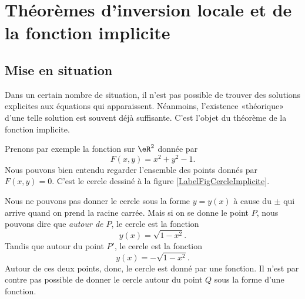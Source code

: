 

                    \section{Théorèmes d'inversion locale et de la fonction implicite}

\subsection{Mise en situation}

Dans un certain nombre de situation, il n'est pas possible de trouver des solutions explicites aux équations qui apparaissent. Néanmoins, l'existence «théorique» d'une telle solution est souvent déjà suffisante. C'est l'objet du théorème de la fonction implicite.

Prenons par exemple la fonction sur $\eR^2$ donnée par 
\begin{equation}
    F(x,y)=x^2+y^2-1.
\end{equation}
Nous pouvons bien entendu regarder l'ensemble des points donnés par $F(x,y)=0$. C'est le cercle dessiné à la figure \ref{LabelFigCercleImplicite}.
\newcommand{\CaptionFigCercleImplicite}{Un cercle pour montrer l'intérêt de la fonction implicite. Si on donne \( x\), nous ne pouvons pas savoir si nous parlons de \( P\) ou de \( P'\).}


%

Nous ne pouvons pas donner le cercle sous la forme $y=y(x)$ à cause du $\pm$ qui arrive quand on prend la racine carrée. Mais si on se donne le point $P$, nous pouvons dire que \emph{autour de $P$}, le cercle est la fonction
\begin{equation}
    y(x)=\sqrt{1-x^2}.
\end{equation}
Tandis que autour du point $P'$, le cercle est la fonction
\begin{equation}
    y(x)=-\sqrt{1-x^2}.
\end{equation}
Autour de ces deux points, donc, le cercle est donné par une fonction. Il n'est par contre pas possible de donner le cercle autour du point $Q$ sous la forme d'une fonction.

